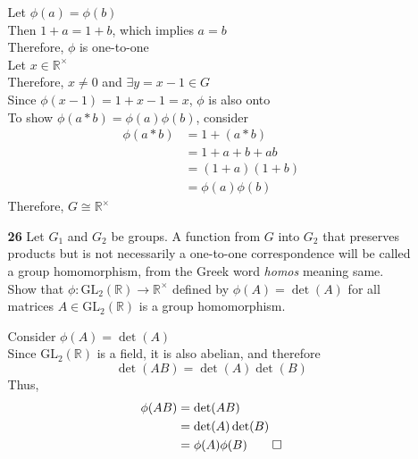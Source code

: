 \documentclass[paper=usletter, fontsize=12pt]{article}
\begin{document}
\begin{itemize}
\begin{itemize}
\begin{cproof}
                Let $\phi(a)=\phi(b)$\\
                Then $1+a=1+b$, which implies $a=b$\\
                Therefore, $\phi$ is one-to-one\\

                Let $x \in \mathbb{R}^{\times}$\\
                Therefore, $x \neq 0$ and $\exists{y = x-1} \in G$\\
                Since $\phi(x-1)=1+x-1=x$, $\phi$ is also onto\\

                To show $\phi(a*b)=\phi(a)\phi(b)$, consider
                \begin{align*}
                    \phi(a*b) & = 1+(a*b)\\
                    & = 1 + a + b + ab\\
                    & = (1+a)(1+b)\\
                    & = \phi(a)\phi(b)
                \end{align*}
                Therefore, $G \cong \mathbb{R}^{\times}$ \qedhere

            \end{cproof}

            \item[\textbf{26}] Let $G_1$ and $G_2$ be groups. A function from
            $G$ into $G_2$ that preserves products but is not necessarily a
            one-to-one correspondence will be called a group homomorphism, from
            the Greek word \textit{homos} meaning same. Show that $\phi:
            \text{GL}_2(\mathbb{R}) \rightarrow \mathbb{R}^{\times}$ defined by
            $\phi(A)=\det(A)$ for all matrices $A \in \text{GL}_2(\mathbb{R})$
            is a group homomorphism.
            \begin{cproof}

                Consider $\phi(A)=\det(A)$\\
                Since $\text{GL}_2(\mathbb{R})$ is a field, it is also abelian,
                and therefore
                \begin{equation*}
                    \det(AB) = \det(A)\det(B)
                \end{equation*}
                Thus,
                \begin{align*}
                    \phi(AB) & = \det(AB) \\
                    & = \det(A)\det(B)\\
                    & = \phi(A)\phi(B) \qedhere
                \end{align*}



\end{cproof}
\end{itemize}
\end{itemize}
\end{document}
